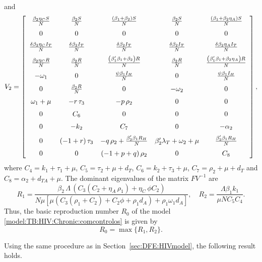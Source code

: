 \documentclass{my_aims}
\theoremstyle{definition}
\begin{document}
and
\begin{equation*}
V_2 =  \left[ \begin {array}{ccccc}
{\frac{\beta_2 \eta_C S}{N}}&{\frac{\beta_2 S}{N}} &
{\frac{\left(\beta_1 + \beta_2\right)S}{N}}&{\frac{\beta_2 S}{N}}&
{\frac{\left(\beta_1 + \beta_2 \eta_A\right)S}{N}} \\ \noalign{\medskip}
0&0&0&0&0\\ \noalign{\medskip}
{\frac {\delta \beta_2 \eta_C I_T}{N}} &{\frac{\delta \beta_2 I_T}{N}}
&{\frac {\delta \beta_2 I_T}{N}}&{\frac{\delta \beta_2 I_T}{N}}&
{\frac {\delta \beta_2 \eta_A I_T}{N}}\\ \noalign{\medskip}
\frac{\beta_2 \eta_C R}{N}&{\frac{\beta_2 R}{N}}&
{\frac{\left(\beta'_1 \beta_1+\beta_2\right)R}{N}}&
{\frac{\beta_2 R}{N}}& \frac{\left(\beta'_1 \beta_1 + \beta_2 \eta_A\right)R}{N} \\
\noalign{\medskip} -\omega_1 &0&{\frac{\psi \beta_1 I_H}{N}}&0&
\frac{\psi \beta_1 I_H}{N}\\ \noalign{\medskip}
0&{\frac{\beta_2 R}{N}}&0&
-\omega_2 &0\\ \noalign{\medskip}
\omega_1 +\mu&-r \, \tau_3 &-p \, \rho_2 &0&0\\
\noalign{\medskip} 0& C_6 &0&0&0\\
\noalign{\medskip} 0&-k_2 & C_7 &0&-\alpha_2\\
\noalign{\medskip} 0&\left( -1+r \right) \tau_3 &-q \,
\rho_2 + {\frac{\beta'_2 \beta_1 R_H}{N}}&
\beta'_2 \lambda_T +\omega_2 +\mu&{\frac{\beta'_2 \beta_1 R_H}{N}}\\
\noalign{\medskip} 0&0&\left(-1+p+q \right) \rho_2 &0& C_8
\end {array} \right],
\end{equation*}
where
$C_4 = k_1 + \tau_1 + \mu$, $C_5 = \tau_2 + \mu + d_T$,
$C_6 = k_2 + \tau_3 + \mu$, $C_7 = \rho_2 + \mu + d_T$
and $C_8 = \alpha_2 + d_{TA} + \mu$.
The dominant eigenvalues of the matrix $F  V^{-1}$ are
\begin{equation*}
R_1 = \frac {{\beta_2}\,\Lambda\, \left( C_3(C_2 +{\eta_A}\,{\rho_1})
+{\eta_C}\,\phi C_2 \right) }
{N \mu \left[ \mu \left(C_3(\rho_1 + C_2) + C_2 \phi
+ \rho_1 d_A \right) + \rho_1 \omega_1 d_A  \right] },
\quad R_2= \frac{\Lambda \beta_1 k_1}{\mu N C_5 C_4}.
\end{equation*}
Thus, the basic reproduction number $R_0$
of the model \eqref{model:TB:HIV:Chronic:comcontrolos} is given by
$$
R_0 = \max \{ R_1, R_2 \}.
$$

Using the same procedure as in Section~\ref{sec:DFE:HIVmodel}, the following result holds.
\end{document}
